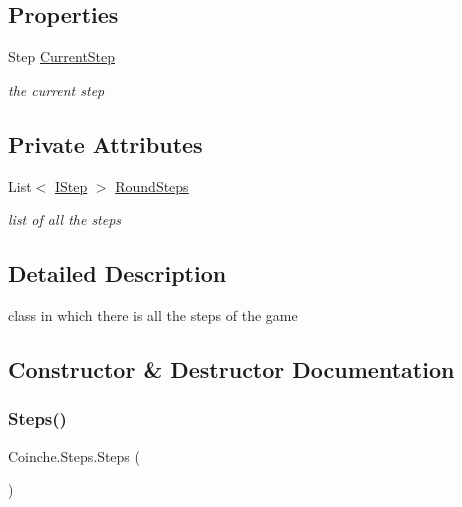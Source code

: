 \subsection*{Properties}
\begin{DoxyCompactItemize}
\item 
Step \hyperlink{class_coinche_1_1_steps_a03916f3a20f2b181afefc14b14663eb3}{Current\+Step}
\begin{DoxyCompactList}\small\item\em the current step \end{DoxyCompactList}\end{DoxyCompactItemize}
\subsection*{Private Attributes}
\begin{DoxyCompactItemize}
\item 
List$<$ \hyperlink{interface_coinche_1_1_i_step}{I\+Step} $>$ \hyperlink{class_coinche_1_1_steps_ae755de9f482239900819fc7d90608b55}{Round\+Steps}
\begin{DoxyCompactList}\small\item\em list of all the steps \end{DoxyCompactList}\end{DoxyCompactItemize}


\subsection{Detailed Description}
class in which there is all the steps of the game 



\subsection{Constructor \& Destructor Documentation}
\mbox{\label{class_coinche_1_1_steps_a7dd11c324b2f7fe132a621970681a02d}} 
\subsubsection{\texorpdfstring{Steps()}{Steps()}}
{\footnotesize\ttfamily Coinche.\+Steps.\+Steps (\begin{DoxyParamCaption}{ }\end{DoxyParamCaption})\hspace{0.3cm}{\ttfamily [inline]}}



